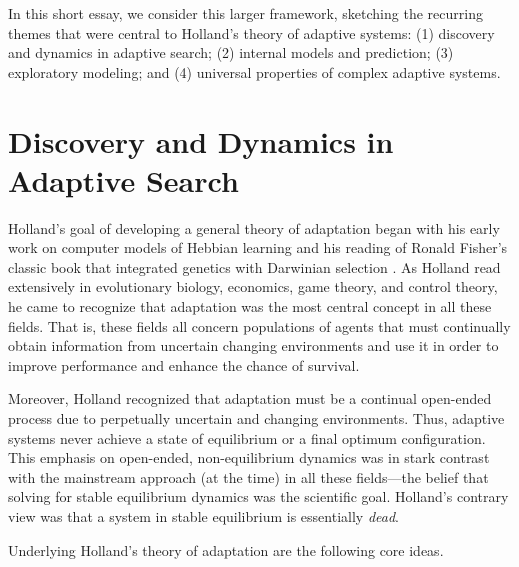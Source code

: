 \documentclass{sig-alternate}
\begin{document}
In this short essay, we consider this larger framework, sketching the
recurring themes that were central to Holland's theory of
adaptive systems: (1) discovery and 
dynamics in adaptive search; (2) internal models and prediction; (3) 
exploratory modeling; and (4) universal properties of complex adaptive systems.  

\section{Discovery and Dynamics in Adaptive Search} 

Holland's goal of developing a general theory of adaptation 
began with his early work on computer models of Hebbian learning
\cite{Rochester1956} and his reading of Ronald Fisher's classic book
that integrated genetics with Darwinian selection \cite{Fisher1930}.
As Holland read extensively in evolutionary biology,
economics, game theory, and control theory, he came to recognize that
adaptation was the most central concept in all these fields.  That is,
these fields all concern populations of agents that must continually
obtain information from uncertain changing environments and use it in
order to improve performance and enhance the chance of survival. 

Moreover, Holland recognized that adaptation must be a continual
open-ended process due to perpetually uncertain and changing
environments.  Thus, adaptive systems never achieve a state of
equilibrium or a final optimum configuration.  This emphasis on
open-ended, non-equilibrium dynamics was in stark contrast with the
mainstream approach (at the time) in all these fields---the belief
that solving for stable equilibrium dynamics was the scientific goal.
Holland's contrary view was that a system in stable equilibrium is
essentially \emph{dead}.

Underlying Holland's theory of adaptation are the following core ideas.  
\end{document}
